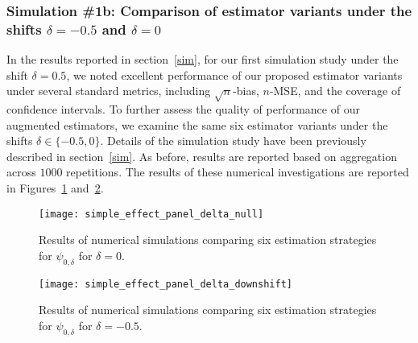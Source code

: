 \subsubsection{Simulation \#1b: Comparison of estimator variants under the
  shifts $\delta = -0.5$ and $\delta = 0$}\label{sim1_supp}

In the results reported in section~\ref{sim}, for our first simulation
study under the shift $\delta = 0.5$, we noted excellent performance of our
proposed estimator variants under several standard metrics, including
$\sqrt{n}$-bias, $n$-MSE, and the coverage of confidence intervals. To further
assess the quality of performance of our augmented estimators, we examine the
same six estimator variants under the shifts $\delta \in \{-0.5, 0\}$. Details
of the simulation study have been previously described in
section~\ref{sim}. As before, results are reported based on aggregation
across $1000$ repetitions. The results of these numerical investigations are
reported in Figures~\ref{fig:simple_sim_delta_noshift}
and~\ref{fig:simple_sim_delta_downshift}.

\begin{figure}[H]
  \centering
  \texttt{[image: simple\_effect\_panel\_delta\_null]}
  \caption{Results of numerical simulations comparing six estimation strategies
  for $\psi_{0,\delta}$ for $\delta = 0$.}
  \label{fig:simple_sim_delta_noshift}
\end{figure}

\begin{figure}[H]
  \centering
  \texttt{[image: simple\_effect\_panel\_delta\_downshift]}
  \caption{Results of numerical simulations comparing six estimation strategies
  for $\psi_{0,\delta}$ for $\delta = -0.5$.}
  \label{fig:simple_sim_delta_downshift}
\end{figure}

